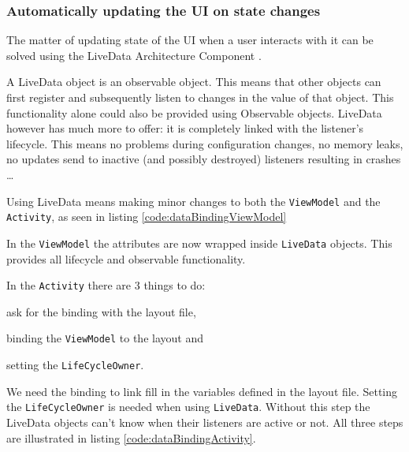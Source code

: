 \subsubsection{Automatically updating the UI on state changes}
The matter of updating state of the UI when a user interacts with it can be solved using the LiveData Architecture Component \cite{liveData}.

A LiveData object is an observable object. This means that other objects can first register and subsequently listen to changes in the value of that object.
This functionality alone could also be provided using Observable objects\cite{observable}.
LiveData however has much more to offer: it is completely linked with the listener's lifecycle. This means no problems during configuration changes, no memory leaks, no updates send to inactive (and possibly destroyed) listeners resulting in crashes \ldots

Using LiveData means making minor changes to both the \lstinline!ViewModel! and the \lstinline!Activity!, as seen in listing \ref{code:dataBindingViewModel}

In the \lstinline!ViewModel! the attributes are now wrapped inside \lstinline!LiveData! objects.
This provides all lifecycle and observable functionality. 



In the \lstinline!Activity! there are 3 things to do:
\begin{inparaenum}[(i)]
	\item ask for the binding with the layout file,
	\item binding the \lstinline!ViewModel! to the layout and
	\item setting the \lstinline!LifeCycleOwner!.
\end{inparaenum}

We need the binding to link fill in the variables defined in the layout file. 
Setting the \lstinline!LifeCycleOwner! is needed when using \lstinline!LiveData!. 
Without this step the LiveData objects can't know when their listeners are active or not. All three steps are illustrated in listing \ref{code:dataBindingActivity}.




